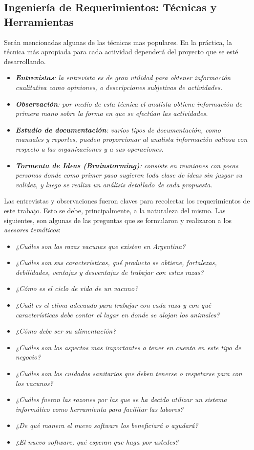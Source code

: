 \documentclass[11pt,oneside]{book}
\begin{document}
\newpage
\subsection{Ingeniería de Requerimientos: Técnicas y Herramientas}
Serán mencionadas algunas de las técnicas mas populares. En la práctica, la técnica más apropiada para cada actividad dependerá del proyecto que se esté desarrollando.
\begin{itemize}
\item \textit{\textbf{Entrevistas}: la entrevista es de gran utilidad para obtener información cualitativa como opiniones, o descripciones subjetivas de actividades.} 
\item \textit{\textbf{Observación}: por medio de esta técnica el analista obtiene información de primera mano sobre la forma en que se efectúan las actividades.}
\item \textit{\textbf{Estudio de documentación}: varios tipos de documentación, como manuales y reportes, pueden proporcionar al analista información valiosa con respecto a las organizaciones y a sus operaciones.} 
\item \textit{\textbf{Tormenta de Ideas (Brainstorming)}: consiste en reuniones con pocas personas donde como primer paso sugieren toda clase de ideas sin juzgar su validez, y luego se realiza un análisis detallado de cada propuesta.} 
\end{itemize}

Las entrevistas y observaciones fueron claves para recolectar los requerimientos de este trabajo. Esto se debe, principalmente, a la naturaleza del mismo. Las siguientes, son algunas de las preguntas que se formularon y realizaron a los \textit{asesores temáticos}:
\begin{itemize}
\item \textit{¿Cuáles son las razas vacunas que existen en Argentina?}
\item \textit{¿Cuáles son sus características, qué producto se obtiene, fortalezas, debilidades, ventajas y desventajas de trabajar con estas razas?}
\item \textit{¿Cómo es el ciclo de vida de un vacuno?}
\item \textit{¿Cuál es el clima adecuado para trabajar con cada raza y con qué características debe contar el lugar en donde se alojan los animales?}
\item \textit{¿Cómo debe ser su alimentación?}
\item \textit{¿Cuáles son los aspectos mas importantes a tener en cuenta en este tipo de negocio?}
\item \textit{¿Cuáles son los cuidados sanitarios que deben tenerse o respetarse para con los vacunos?}
\item \textit{¿Cuáles fueron las razones por las que se ha decido utilizar un sistema informático como herramienta para facilitar las labores?}
\item \textit{¿De qué manera el nuevo software los beneficiará o ayudará?}  
\item \textit{¿El nuevo software, qué esperan que haga por ustedes?}
\end{itemize}
\end{document}
